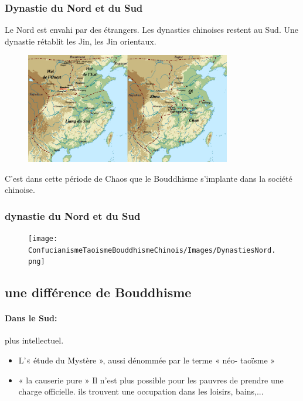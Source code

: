  
\subsubsection{Dynastie du Nord et du Sud}
Le Nord est envahi par des étrangers. Les dynasties chinoises restent au Sud. Une dynastie rétablit les Jin, les Jin orientaux. 

\begin{figure}[!h]
    \centering
    \includegraphics[width=0.8\textwidth]{ConfucianismeTaoismeBouddhismeChinois/Images/Dynastie3.png}
 
    \label{fig:enter-label}
\end{figure}

C'est dans cette période de Chaos que le Bouddhisme s'implante dans la société chinoise.

\subsubsection{dynastie du Nord et du Sud}
\begin{figure}[!h]
    \centering
    \texttt{[image: ConfucianismeTaoismeBouddhismeChinois/Images/DynastiesNord.png]}
 
    \label{fig:enter-label}
\end{figure} 


\subsection{une différence de Bouddhisme}
\paragraph{Dans le Sud:} plus intellectuel.

\begin{itemize}
    \item L’« étude du Mystère », aussi dénommée par le terme « néo- taoïsme »
    \item « la causerie pure »
 Il n'est plus possible pour les pauvres de prendre une charge officielle. ils trouvent une occupation dans les loisirs, bains,...
\end{itemize}



